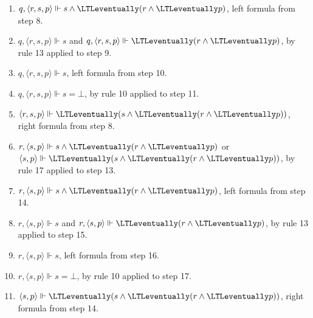\begin{myEx}
\begin{enumerate}
\item $q, \langle r,s,p \rangle \Vdash s \land \LTLeventually(r \land \LTLeventually p)$, left formula from step 8.\\ %

\item $q, \langle r,s,p \rangle \Vdash s$ and $q, \langle r,s,p \rangle \Vdash \LTLeventually(r \land \LTLeventually p)$, by rule 13 applied to step 9.\\ %

\item $q, \langle r,s,p \rangle \Vdash s$, left formula from step 10.\\ %

\item $q, \langle r,s,p \rangle \Vdash s = \bot$, by rule 10 applied to step 11.\\ %

\item $\langle r,s,p \rangle \Vdash \LTLeventually(s \land \LTLeventually(r \land \LTLeventually p))$, right formula from step 8.\\ %

\item $r, \langle s,p \rangle \Vdash s \land \LTLeventually(r \land \LTLeventually p)$ or $\langle s,p \rangle \Vdash \LTLeventually(s \land \LTLeventually(r \land \LTLeventually p))$, by rule 17 applied to step 13.\\ %

\item $r, \langle s,p \rangle \Vdash s \land \LTLeventually(r \land \LTLeventually p)$, left formula from step 14.\\ %

\item $r, \langle s,p \rangle \Vdash s$ and $r, \langle s,p \rangle \Vdash \LTLeventually(r \land \LTLeventually p)$, by rule 13 applied to step 15.\\ %

\item $r, \langle s,p \rangle \Vdash s$, left formula from step 16.\\ %

\item $r, \langle s,p \rangle \Vdash s = \bot$, by rule 10 applied to step 17.\\ %

\item $\langle s,p \rangle \Vdash \LTLeventually(s \land \LTLeventually(r \land \LTLeventually p))$, right formula from step 14.\\ %


\end{enumerate}
\end{myEx}
